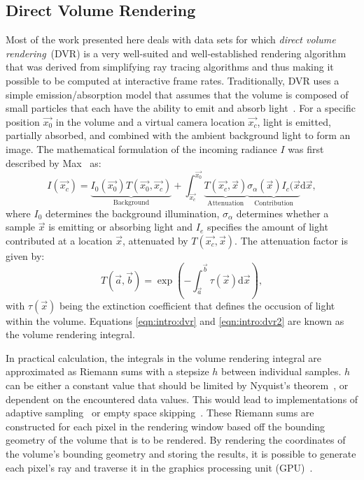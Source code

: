 \subsection{Direct Volume Rendering} \label{cha:intro:vp:dvr}
Most of the work presented here deals with  data sets for which \emph{direct volume rendering}~(DVR) is a very well-suited and well-established rendering algorithm that was derived from simplifying ray tracing algorithms and thus making it possible to be computed at interactive frame rates.  Traditionally, DVR uses a simple emission/absorption model that assumes that the volume is composed of small particles that each have the ability to emit and absorb light~\cite{levoy1988display, drebin1988volume, sabella1988rendering}.  For a specific position $\vec{x_0}$ in the volume and a virtual camera location $\vec{x_c}$, light is emitted, partially absorbed, and combined with the ambient background light to form an image.  The mathematical formulation of the incoming radiance $I$ was first described by Max~\cite{max1995optical, max2010local} as:
\begin{equation}
I(\vec{x_c}) = \underbrace{I_0\left( \vec{x_0} \right) T\left( \vec{x_0}, \vec{x_c} \right)}_{\textrm{Background}} + \int_\vec{x_c}^\vec{x_0}  \underbrace{T(\vec{x_c}, \vec{x})}_{\textrm{Attenuation}} \underbrace{\sigma_\alpha(\vec{x}) I_c(\vec{x}}_{\textrm{Contribution}} \textrm{d} \vec{x},
\label{eqn:intro:dvr}
\end{equation}
\noindent where $I_0$ determines the background illumination, $\sigma_\alpha$ determines whether a sample $\vec{x}$ is emitting or absorbing light and $I_e$ specifies the amount of light contributed at a location $\vec{x}$, attenuated by $T(\vec{x_c}, \vec{x})$.  The attenuation factor is given by:
\begin{equation}
T(\vec{a}, \vec{b}) = \exp \left( -\int_\vec{a}^\vec{b} \tau(\vec{x}) \textrm{d} \vec{x} \right),
\label{eqn:intro:dvr2}
\end{equation}
\noindent with $\tau(\vec{x})$ being the extinction coefficient that defines the occusion of light within the volume.  Equations \ref{eqn:intro:dvr} and \ref{eqn:intro:dvr2} are known as the volume rendering integral.

In practical calculation, the integrals in the volume rendering integral are approximated as Riemann sums with a stepsize $h$ between individual samples.  $h$ can be either a constant value that should be limited by Nyquist's theorem~\cite{shannon1949communication}, or dependent on the encountered data values.  This would lead to implementations of adaptive sampling~\cite{danskin1992fast} or empty space skipping~\cite{yagel1993accelerating}.  These Riemann sums are constructed for each pixel in the rendering window based off the bounding geometry of the volume that is to be rendered.  By rendering the coordinates of the volume's bounding geometry and storing the results, it is possible to generate each pixel's ray and traverse it in the graphics processing unit (GPU)~\cite{kruger2003acceleration}.

